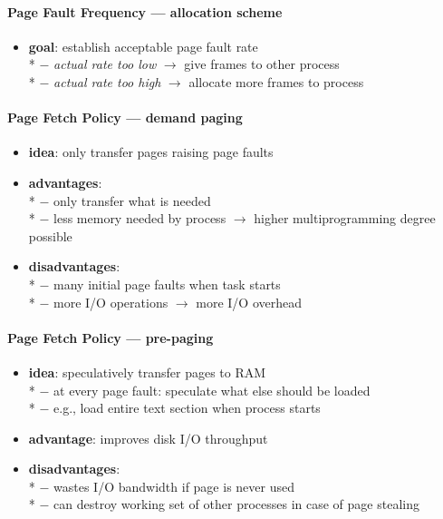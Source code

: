 \paragraph{Page Fault Frequency --- allocation scheme}
\begin{itemize}
  \item \textbf{goal}: establish acceptable page fault rate \\*
    $ - $ \emph{actual rate too low} $ \to $ give frames to other process \\*
    $ - $ \emph{actual rate too high} $ \to $ allocate more frames to process
\end{itemize}

\paragraph{Page Fetch Policy --- demand paging}
\begin{itemize}
  \item \textbf{idea}: only transfer pages raising page faults
  \item \textbf{advantages}: \\*
    $ - $ only transfer what is needed \\*
    $ - $ less memory needed by process $ \to $ higher multiprogramming degree possible
  \item \textbf{disadvantages}: \\*
    $ - $ many initial page faults when task starts \\*
    $ - $ more I/O operations $ \to $ more I/O overhead
\end{itemize}

\paragraph{Page Fetch Policy --- pre-paging}
\begin{itemize}
  \item \textbf{idea}: speculatively transfer pages to RAM \\*
    $ - $ at every page fault: speculate what else should be loaded \\*
    $ - $ e.g., load entire text section when process starts
  \item \textbf{advantage}: improves disk I/O throughput
  \item \textbf{disadvantages}: \\*
    $ - $ wastes I/O bandwidth if page is never used \\*
    $ - $ can destroy working set of other processes in case of page stealing
\end{itemize}

